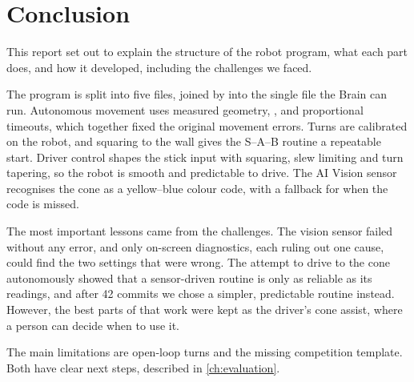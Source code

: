 \chapter{Conclusion}
\label{ch:conclusion}

This report set out to explain the structure of the robot program, what each part
does, and how it developed, including the challenges we faced.

The program is split into five files, joined by  into the single
file the Brain can run. Autonomous movement uses measured geometry, ,
and proportional timeouts, which together fixed the original movement errors.
Turns are calibrated on the robot, and squaring to the wall gives the S--A--B
routine a repeatable start. Driver control shapes the stick input with squaring,
slew limiting and turn tapering, so the robot is smooth and predictable to drive.
The AI Vision sensor recognises the cone as a yellow--blue colour code, with a
fallback for when the code is missed.

The most important lessons came from the challenges. The vision sensor failed
without any error, and only on-screen diagnostics, each ruling out one cause, could
find the two settings that were wrong. The attempt to drive to the cone
autonomously showed that a sensor-driven routine is only as reliable as its
readings, and after 42 commits we chose a simpler, predictable routine instead.
However, the best parts of that work were kept as the driver's cone assist, where a
person can decide when to use it.

The main limitations are open-loop turns and the missing competition template. Both
have clear next steps, described in \cref{ch:evaluation}.
